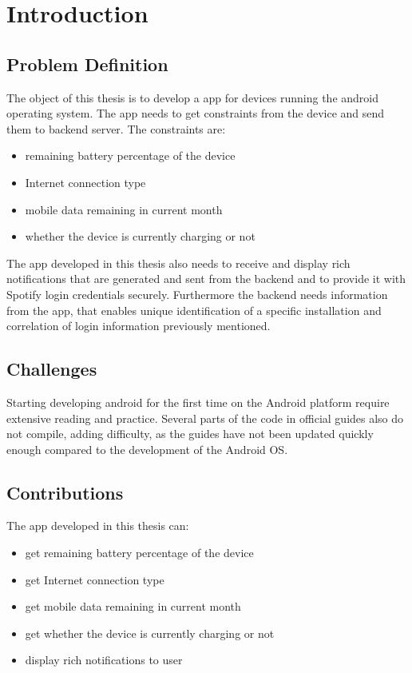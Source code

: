 
\chapter{Introduction} %
\label{Chapter1}



\section{Problem Definition}
The object of this thesis is to develop a app for devices running the android operating system. The app needs to  get constraints from the device and send them to backend server. The constraints are:
\begin{itemize}
	\item remaining battery percentage of the device
	\item Internet connection type
	\item mobile data remaining in current month 
	\item whether the device is currently charging or not
\end{itemize}
The app developed in this thesis also needs to receive and display rich notifications that are generated and sent from the backend and to provide it with Spotify login credentials securely. Furthermore the backend needs information from the app, that enables unique identification of a specific installation and correlation of login information previously mentioned.


\section{Challenges}
Starting developing android for the first time on the Android platform require extensive reading and practice. Several parts of the code in official guides also do not compile, adding difficulty, as the guides have not been updated quickly enough compared to the development of the Android OS.

\section{Contributions}
The app developed in this thesis can:
\begin{itemize}
	\item get remaining battery percentage of the device
	\item get Internet connection type
	\item get mobile data remaining in current month 
	\item get whether the device is currently charging or not 
	\item display rich notifications to user
\end{itemize}

